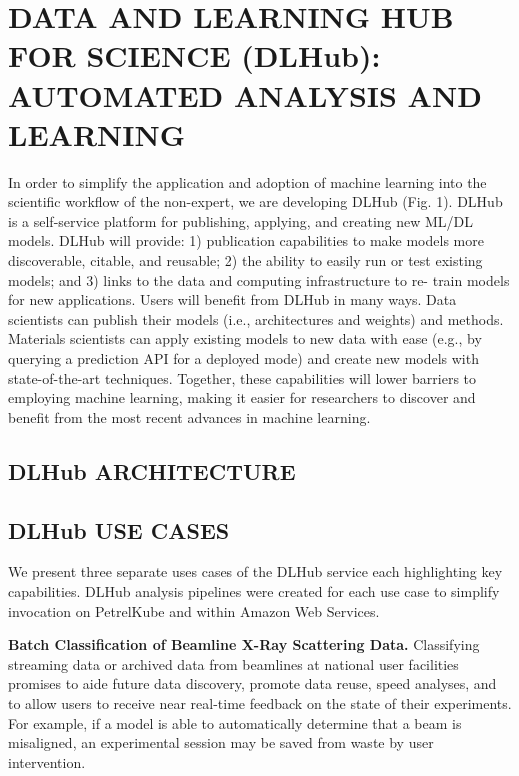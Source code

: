 \documentclass{aip-cp}
\newcommand\ben[1]{}
\newcommand\ben[1]{{\color{blue}[Ben: #1]}}
\begin{document}
\section{DATA AND LEARNING HUB FOR SCIENCE (DLHub): AUTOMATED ANALYSIS AND LEARNING}

In order to simplify the application and adoption of machine learning into the
scientific workflow of the non-expert, we are developing DLHub (Fig. 1). DLHub
is a self-service platform for publishing, applying, and creating new ML/DL
models. DLHub will provide: 1) publication capabilities to make models more
discoverable, citable, and reusable; 2) the ability to easily run or test
existing models; and 3) links to the data and computing infrastructure to re-
train models for new applications. Users will benefit from DLHub in many ways.
Data scientists can publish their models (i.e., architectures and weights) and
methods. Materials scientists can apply existing models to new data with ease
(e.g., by querying a prediction API for a deployed mode) and create new models
with state-of-the-art techniques. Together, these capabilities will lower
barriers to employing machine learning, making it easier for researchers to
discover and benefit from the most recent advances in machine learning.

\subsection{DLHub ARCHITECTURE}


\subsection{DLHub USE CASES}
We present three separate uses cases of the DLHub service each highlighting
key capabilities. DLHub analysis pipelines were created for each
use case to simplify invocation on PetrelKube and within Amazon Web Services.
\ben{refine and add based on other paper components and DLHub architecture section}

\textbf{Batch Classification of Beamline X-Ray Scattering Data.}
Classifying streaming data or archived data from beamlines at national user
facilities promises to aide future data discovery, promote data reuse, speed
analyses, and to allow users to receive near real-time feedback on the state
of their experiments. For example, if a model is able to automatically
determine that a beam is misaligned, an experimental session may be saved from
waste by user intervention.
\end{document}

